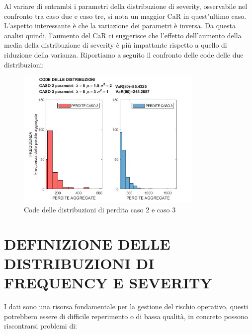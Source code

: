 \documentclass[titlepage]{article}
\begin{document}
\begin{itemize}
		Al variare di entrambi i parametri della distribuzione di severity, osservabile nel confronto tra caso due e caso tre, si nota un maggior CaR in quest’ultimo caso. L’aspetto interessante è che la variazione dei parametri è inversa. Da questa analisi quindi, l’aumento del CaR ci suggerisce che l’effetto dell’aumento della media della distribuzione di severity è più impattante rispetto a quello di riduzione della varianza. Riportiamo a seguito il confronto delle code delle due distribuzioni:
\begin{figure}[htbp]
	\centering
	\includegraphics[width=0.8\textwidth]{CODE2VS3.jpg}
	\caption{\label{fig:CODE 2VS3.jpg}Code delle distribuzioni di perdita caso 2 e caso 3}
\end{figure}
\newpage
\section{DEFINIZIONE DELLE DISTRIBUZIONI DI FREQUENCY E SEVERITY}
 I dati sono una risorsa fondamentale per la gestione del rischio operativo, questi potrebbero essere di difficile reperimento o di bassa qualità, in concreto possono riscontrarsi problemi di:
 \begin{itemize}
 	


\end{itemize}
\end{itemize}
\end{document}
